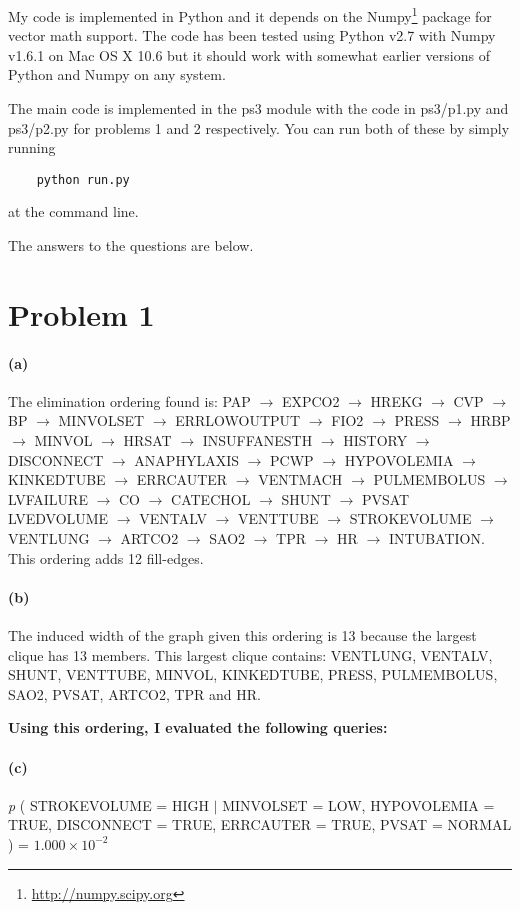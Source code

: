\documentclass[11pt]{article}
\newcommand{\code}[1]{{\sffamily #1}}
\begin{document}
My code is implemented in \code{Python} and it depends on the
\code{Numpy}\footnote{\url{http://numpy.scipy.org}} package for vector
math support. The code has been tested using \code{Python v2.7} with
\code{Numpy v1.6.1} on \code{Mac OS X 10.6} but it should work with somewhat
earlier versions of \code{Python} and \code{Numpy} on any system.

The main code is implemented in the \code{ps3} module with the code in
\code{ps3/p1.py} and \code{ps3/p2.py} for problems 1 and 2 respectively.
You can run both of these by simply running
\begin{lstlisting}
    python run.py
\end{lstlisting}
at the command line.

The answers to the questions are below.

\section{Problem 1}

\paragraph{(a)} The elimination ordering found is: PAP $\to$ EXPCO2 $\to$
HREKG $\to$ CVP $\to$ BP $\to$ MINVOLSET $\to$
ERRLOWOUTPUT $\to$ FIO2 $\to$ PRESS $\to$ HRBP $\to$ MINVOL $\to$ HRSAT $\to$
INSUFFANESTH $\to$ HISTORY $\to$ DISCONNECT $\to$ ANAPHYLAXIS $\to$ PCWP
$\to$ HYPOVOLEMIA $\to$ KINKEDTUBE $\to$ ERRCAUTER $\to$ VENTMACH $\to$
PULMEMBOLUS $\to$ LVFAILURE $\to$ CO $\to$ CATECHOL $\to$ SHUNT $\to$ PVSAT
LVEDVOLUME $\to$ VENTALV $\to$ VENTTUBE $\to$ STROKEVOLUME $\to$ VENTLUNG
$\to$ ARTCO2 $\to$ SAO2 $\to$ TPR $\to$ HR $\to$ INTUBATION.
This ordering adds 12 fill-edges.

\paragraph{(b)} The induced width of the graph given this ordering is 13
because the largest clique has 13 members. This largest clique contains:
VENTLUNG, VENTALV, SHUNT, VENTTUBE, MINVOL, KINKEDTUBE, PRESS, PULMEMBOLUS,
SAO2, PVSAT, ARTCO2, TPR and HR.

\vspace{1cm}
\noindent
{\bf Using this ordering, I evaluated the following queries:}

\paragraph{(c)}
    \emph{p} ( STROKEVOLUME = HIGH $|$ MINVOLSET = LOW, HYPOVOLEMIA = TRUE,
        DISCONNECT = TRUE, ERRCAUTER = TRUE, PVSAT = NORMAL )
        = $1.000\times10^{-2}$
\end{document}
